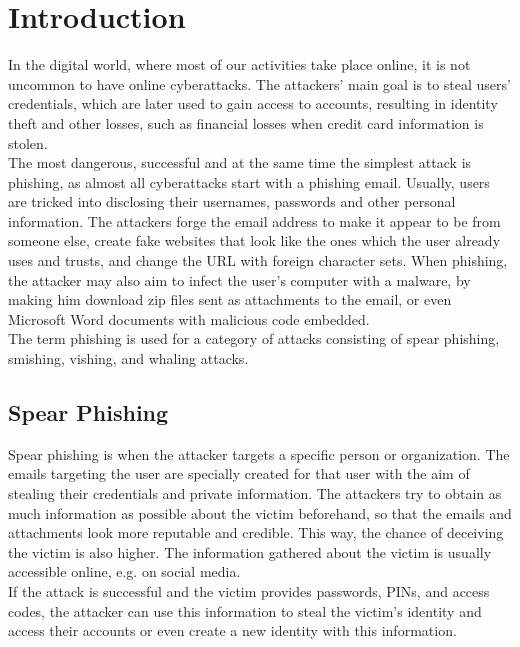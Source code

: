 \section{Introduction}
In the digital world, where most of our activities take place online, it is not uncommon to have online cyberattacks. The attackers’ main goal is to steal users’ credentials, which are later used to gain access to accounts, resulting in identity theft and other losses, such as financial losses when credit card information is stolen. \\

The most dangerous, successful and at the same time the simplest attack is phishing, as almost all cyberattacks start with a phishing email. Usually, users are tricked into disclosing their usernames, passwords and other personal information. The attackers forge the email address to make it appear to be from someone else, create fake websites that look like the ones which the user already uses and trusts, and change the URL with foreign character sets. 
When phishing, the attacker may also aim to infect the user’s computer with a malware, by making him download zip files sent as attachments to the email, or even Microsoft Word documents with malicious code embedded. \\

The term phishing is used for a category of attacks consisting of spear phishing, smishing, vishing, and whaling attacks.

\subsection{Spear Phishing}
Spear phishing is when the attacker targets a specific person or organization. The emails targeting the user are specially created for that user with the aim of stealing their credentials and private information.
The attackers try to obtain as much information as possible about the victim beforehand, so that the emails and attachments look more reputable and credible. This way, the chance of deceiving the victim is also higher. The information gathered about the victim is usually accessible online, e.g. on social media. \\
If the attack is successful and the victim provides passwords, PINs, and access codes, the attacker can use this information to steal the victim's identity and access their accounts or even create a new identity with this information.

